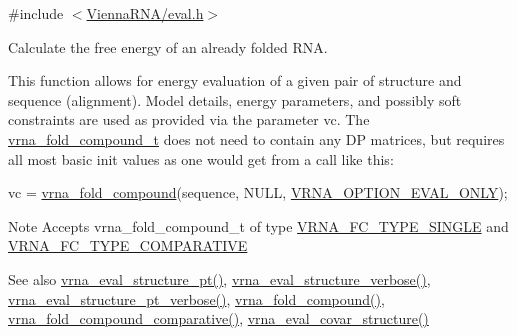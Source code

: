 {\ttfamily \#include $<$\hyperlink{eval_8h}{Vienna\+R\+N\+A/eval.\+h}$>$}



Calculate the free energy of an already folded R\+NA. 

This function allows for energy evaluation of a given pair of structure and sequence (alignment). Model details, energy parameters, and possibly soft constraints are used as provided via the parameter \textquotesingle{}vc\textquotesingle{}. The \hyperlink{group__fold__compound_ga1b0cef17fd40466cef5968eaeeff6166}{vrna\+\_\+fold\+\_\+compound\+\_\+t} does not need to contain any DP matrices, but requires all most basic init values as one would get from a call like this\+: 
\begin{DoxyCode}
vc = \hyperlink{group__fold__compound_ga6601d994ba32b11511b36f68b08403be}{vrna\_fold\_compound}(sequence, NULL, \hyperlink{group__fold__compound_ga61469c423131552c8483229f8b6c7e0e}{VRNA\_OPTION\_EVAL\_ONLY});
\end{DoxyCode}


\begin{DoxyNote}{Note}
Accepts vrna\+\_\+fold\+\_\+compound\+\_\+t of type \hyperlink{group__fold__compound_gga01a4ff86fa71deaaa5d1abbd95a1447da7e264dd3cf2dc9b6448caabcb7763cd6}{V\+R\+N\+A\+\_\+\+F\+C\+\_\+\+T\+Y\+P\+E\+\_\+\+S\+I\+N\+G\+LE} and \hyperlink{group__fold__compound_gga01a4ff86fa71deaaa5d1abbd95a1447dab821ce46ea3cf665be97df22a76f5023}{V\+R\+N\+A\+\_\+\+F\+C\+\_\+\+T\+Y\+P\+E\+\_\+\+C\+O\+M\+P\+A\+R\+A\+T\+I\+VE}
\end{DoxyNote}
\begin{DoxySeeAlso}{See also}
\hyperlink{group__eval_gadbd09372ddfd7a450bbd590c96a6bfe4}{vrna\+\_\+eval\+\_\+structure\+\_\+pt()}, \hyperlink{group__eval_ga0928d699d310178f84ee2351034e5cb5}{vrna\+\_\+eval\+\_\+structure\+\_\+verbose()}, \hyperlink{group__eval_ga8a517cfeeae8c376ae7b1e0c401d38b4}{vrna\+\_\+eval\+\_\+structure\+\_\+pt\+\_\+verbose()}, \hyperlink{group__fold__compound_ga6601d994ba32b11511b36f68b08403be}{vrna\+\_\+fold\+\_\+compound()}, \hyperlink{group__fold__compound_gad6bacc816af274922b13d947f708aa0c}{vrna\+\_\+fold\+\_\+compound\+\_\+comparative()}, \hyperlink{group__eval_ga6cea75c0eb9857fb59172be54cab09e0}{vrna\+\_\+eval\+\_\+covar\+\_\+structure()}
\end{DoxySeeAlso}

